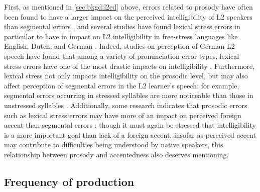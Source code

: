 	First, as mentioned in \cref{sec:bkgd:l2ed} above, errors related to prosody have 
	often
	 been found to have a larger impact on the perceived intelligibility of L2 speakers than segmental errors \citep{Hahn2004,Derwing2005,Witt2012}, and several studies have found lexical stress errors in particular to have in impact on L2 intelligibility
	 in free-stress languages like English, Dutch, and 
	 German \citep{Hirschfeld1994,Cutler2005,Field2005}.
	Indeed, studies on perception of German L2 speech have found that among a variety of pronunciation error types, lexical stress errors have one of the most drastic impacts on intelligibility \citep{Hirschfeld1994}.
%
		Furthermore, lexical stress not only impacts intelligibility on the prosodic level, but may also affect perception of segmental errors in the L2 learner's speech; for example, segmental errors occurring in stressed syllables are more noticeable than those in unstressed syllables \citep{Cutler2005,Michaux2012}. 
		Additionally, some research indicates that prosodic errors such as lexical stress errors may have more of an impact on perceived foreign accent than segmental errors \citep{Hahn2004,Witt2012}; though it must again be stressed that intelligibility is a more important goal than lack of a foreign accent, insofar as perceived accent may contribute to difficulties being understood by native speakers, this relationship between prosody and accentedness also deserves mentioning.

		\subsection{Frequency of production}
		\label{sec:targeting:frequency}

